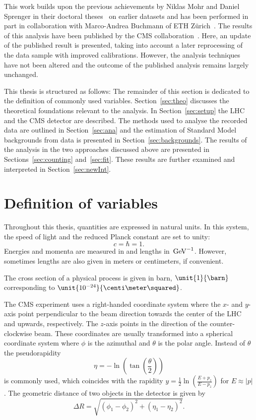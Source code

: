 This work builds upon the previous achievements by Niklas Mohr and Daniel Sprenger in their doctoral theses~\cite{Mohr:1423334,Sprenger:1501963} on earlier datasets and has been performed in part in collaboration with Marco-Andrea Buchmann of ETH Z\"urich~\cite{Buchmann:1704399}. The results of this analysis have been published by the CMS collaboration~\cite{Khachatryan:2015lwa}. Here, an update of the published result is presented, taking into account a later reprocessing of the data sample with improved calibrations. However, the analysis techniques have not been altered and the outcome of the published analysis remains largely unchanged.

This thesis is structured as follows: The remainder of this section is dedicated to the definition of commonly used variables. Section~\ref{sec:theo} discusses the theoretical foundations relevant to the analysis. In Section~\ref{sec:setup} the LHC and the CMS detector are described. The methods used to analyse the recorded data are outlined in Section~\ref{sec:ana} and the estimation of Standard Model backgrounds from data is presented in Section~\ref{sec:backgrounds}. The results of the analysis in the two approaches discussed above are presented in Sections~\ref{sec:counting} and~\ref{sec:fit}. These results are further examined and interpreted in Section~\ref{sec:newInt}. 

\section{Definition of variables}
\label{sec:variables}
Throughout this thesis, quantities are expressed in natural units. In this system, the speed of light and the reduced Planck constant are set to unity:
\begin{equation}
c = \hbar = 1.
\end{equation} 
Energies and momenta are measured in \GeV and lengths in $\text{\ensuremath{\,\mathrm{Ge\hspace{-.08em}V}}}^{-1}$. However, sometimes lengths are also given in meters or centimeters, if convenient. 

The cross section of a physical process is given in barn, $\unit{1}{\barn}$ corresponding to $\unit{10^{-24}}{\centi\meter\squared}$.   

The CMS experiment uses a right-handed coordinate system where the $x$- and $y$-axis point perpendicular to the beam direction towards the center of the LHC and upwards, respectively. The $z$-axis points in the direction of the counter-clockwise beam.  These coordinates are usually transformed into a spherical coordinate system where $\phi$ is the azimuthal and $\theta$ is the polar angle. Instead of $\theta$ the pseudorapidity 
\begin{equation}
\eta = -\ln \left( \tan\left(\frac{\theta}{2}\right)\right)
\end{equation}
is commonly used, which coincides with the rapidity $y = \frac{1}{2} \ln\left(\frac{E+p_z}{E-p_z}\right)$ for $E\approx |p|$. The geometric distance of two objects in the detector is given by
\begin{equation}
\Delta R = \sqrt{(\phi_1 - \phi_2)^2 + (\eta_1 - \eta_2)^2}.
\end{equation}

